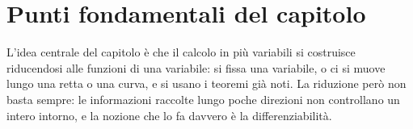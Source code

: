 \section{Punti fondamentali del capitolo}
\label{sec:sintesi-cap07}

L'idea centrale del capitolo è che il calcolo in più variabili si costruisce riducendosi
alle funzioni di una variabile: si fissa una variabile, o ci si muove lungo una retta o
una curva, e si usano i teoremi già noti. La riduzione però non basta sempre: le
informazioni raccolte lungo poche direzioni non controllano un intero intorno, e la
nozione che lo fa davvero è la differenziabilità.

